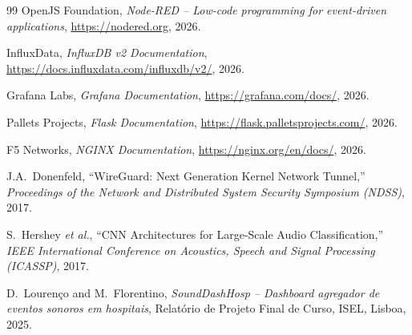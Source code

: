 \documentclass[12pt,a4paper]{report}
\begin{document}
\begin{thebibliography}{99}
OpenJS Foundation,
\textit{Node-RED -- Low-code programming for event-driven applications},
\url{https://nodered.org}, 2026.

InfluxData,
\textit{InfluxDB v2 Documentation},
\url{https://docs.influxdata.com/influxdb/v2/}, 2026.

Grafana Labs,
\textit{Grafana Documentation},
\url{https://grafana.com/docs/}, 2026.

Pallets Projects,
\textit{Flask Documentation},
\url{https://flask.palletsprojects.com/}, 2026.

F5 Networks,
\textit{NGINX Documentation},
\url{https://nginx.org/en/docs/}, 2026.

J.A.~Donenfeld,
``WireGuard: Next Generation Kernel Network Tunnel,''
\textit{Proceedings of the Network and Distributed System Security Symposium (NDSS)}, 2017.

S.~Hershey \textit{et al.},
``CNN Architectures for Large-Scale Audio Classification,''
\textit{IEEE International Conference on Acoustics, Speech and Signal Processing (ICASSP)}, 2017.

D.~Lourenço and M.~Florentino,
\textit{SoundDashHosp -- Dashboard agregador de eventos sonoros em hospitais},
Relatório de Projeto Final de Curso, ISEL, Lisboa, 2025.

\end{thebibliography}
\end{document}
